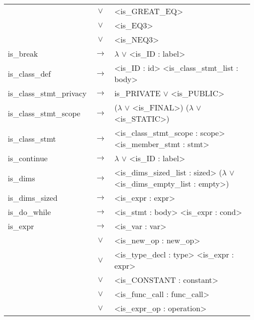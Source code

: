 \documentclass[a4paper]{article}
\begin{document}
\begin{longtable}{lcl}
								& $\vee$ & <is\_GREAT\_EQ> \\
								& $\vee$ & <is\_EQ3> \\
								& $\vee$ & <is\_NEQ3> \\
	is\_break 					& $\to$ & $\lambda$ $\vee$ <is\_ID : label> \\
	is\_class\_def				& $\to$ & <is\_ID : id> <is\_class\_stmt\_list : body> \\
	is\_class\_stmt\_privacy	& $\to$ & is\_PRIVATE $\vee$ <is\_PUBLIC>\\	
	is\_class\_stmt\_scope		& $\to$ &($\lambda$ $\vee$ <is\_FINAL>) ($\lambda$ $\vee$ <is\_STATIC>) \\
	is\_class\_stmt 			& $\to$ & <is\_class\_stmt\_scope : scope> <is\_member\_stmt : stmt> \\
	is\_continue				& $\to$ & $\lambda$ $\vee$ <is\_ID : label> \\
	is\_dims					& $\to$ & <is\_dims\_sized\_list : sized> ($\lambda$ $\vee$ <is\_dims\_empty\_list : empty>) \\
	is\_dims\_sized				& $\to$ & <is\_expr : expr> \\
	is\_do\_while				& $\to$ & <is\_stmt : body> <is\_expr : cond> \\
	is\_expr					& $\to$ & <is\_var : var> \\
								& $\vee$ & <is\_new\_op : new\_op> \\
								& $\vee$ & <is\_type\_decl : type> <is\_expr : expr>\\
								& $\vee$ & <is\_CONSTANT : constant> \\
								& $\vee$ & <is\_func\_call : func\_call> \\
								& $\vee$ & <is\_expr\_op : operation> \\


\end{longtable}
\end{document}
